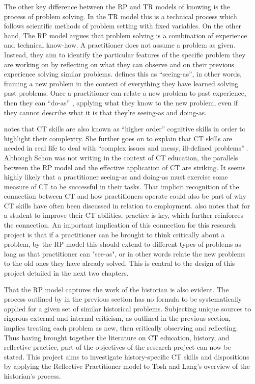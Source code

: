 \documentclass{l4proj}
\begin{document}
The other key difference between the RP and TR models of knowing is the process of problem solving. In the TR model this is a technical process which follows scientific methods of problem setting with fixed variables. On the other hand, The RP model argues that problem solving is a combination of experience and technical know-how. A practitioner does not assume a problem as given. Instead, they aim to identify the particular features of the specific problem they are working on by reflecting on what they can observe and on their previous experience solving similar problems. \citet{schon1984reflective} defines this as “seeing-as”, in other words, framing a new problem in the context of everything they have learned solving past problems. Once a practitioner can relate a new problem to past experience, then they can “do-as” \citep{schon1984reflective}, applying what they know to the new problem, even if they cannot describe what it is that they’re seeing-as and doing-as. 

\citet{halpern1998teaching} notes that CT skills are also known as “higher order” cognitive skills in order to highlight their complexity. She further goes on to explain that CT skills are needed in real life to deal with “complex issues and messy, ill-defined problems” \citep{halpern1998teaching}. Although Schon was not writing in the context of CT education, the parallels between the RP model and the effective application of CT are striking. It seems highly likely that a practitioner seeing-as and doing-as must exercise some measure of CT to be successful in their tasks. That implicit recognition of the connection between CT and how practitioners operate could also be part of why CT skills have often been discussed in relation to employment. \citet{willingham2008critical} also notes that for a student to improve their CT abilities, practice is key, which further reinforces the connection. An important implication of this connection for this research project is that if a practitioner can be brought to think critically about a problem, by the RP model this should extend to different types of problems as long as that practitioner can "see-as", or in other words relate the new problems to the old ones they have already solved. This is central to the design of this project detailed in the next two chapters. 

That the RP model captures the work of the historian is also evident. The process outlined by \citet{tosh2006pursuit} in the previous section has no formula to be systematically applied for a given set of similar historical problems. Subjecting unique sources to rigorous external and internal criticism, as outlined in the previous section, implies treating each problem as new, then critically observing and reflecting. Thus having brought together the literature on CT education, history, and reflective practice, part of the objectives of the research project can now be stated. This project aims to investigate history-specific CT skills and dispositions by applying the Reflective Practitioner model to Tosh and Lang’s overview of the historian’s process. 
\end{document}

